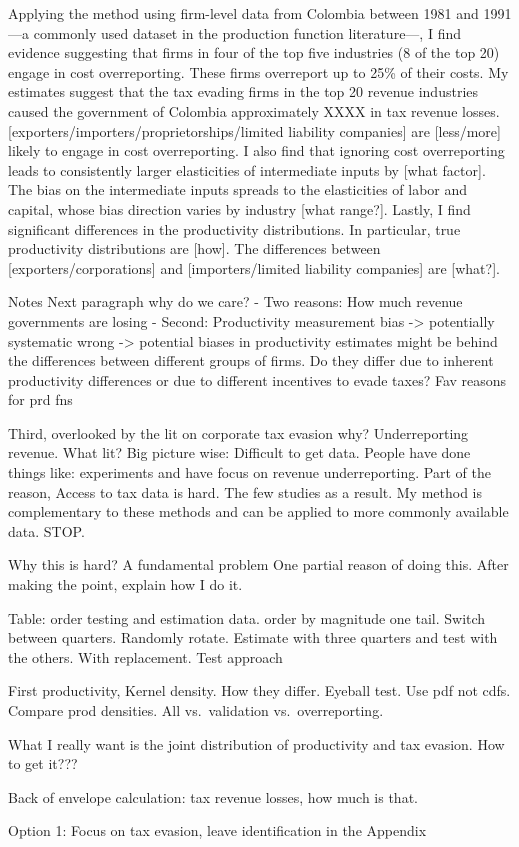 \documentclass[
  12pt]{article}
\theoremstyle{definition}
\theoremstyle{remark}
\begin{document}
 Applying the method using
firm-level data from Colombia between 1981 and 1991 ---a commonly used
dataset in the production function literature---, I find evidence
suggesting that firms in four of the top five industries (8 of the top
20) engage in cost overreporting. These firms overreport up to 25\% of
their costs. My estimates suggest that the tax evading firms in the top
20 revenue industries caused the government of Colombia approximately
XXXX in tax revenue losses.
{[}exporters/importers/proprietorships/limited liability companies{]}
are {[}less/more{]} likely to engage in cost overreporting. I also find
that ignoring cost overreporting leads to consistently larger
elasticities of intermediate inputs by {[}what factor{]}. The bias on
the intermediate inputs spreads to the elasticities of labor and
capital, whose bias direction varies by industry {[}what range?{]}.
Lastly, I find significant differences in the productivity
distributions. In particular, true productivity distributions are
{[}how{]}. The differences between {[}exporters/corporations{]} and
{[}importers/limited liability companies{]} are {[}what?{]}.

\begin{anfxnote}{Notes}
Next paragraph why do we care? - Two reasons: How much revenue
governments are losing - Second: Productivity measurement bias
-\textgreater{} potentially systematic wrong -\textgreater{} potential
biases in productivity estimates might be behind the differences between
different groups of firms. Do they differ due to inherent productivity
differences or due to different incentives to evade taxes? Fav reasons
for prd fns

Third, overlooked by the lit on corporate tax evasion why?
Underreporting revenue. What lit? Big picture wise: Difficult to get
data. People have done things like: experiments and have focus on
revenue underreporting. Part of the reason, Access to tax data is hard.
The few studies as a result. My method is complementary to these methods
and can be applied to more commonly available data. STOP.

Why this is hard? A fundamental problem One partial reason of doing
this. After making the point, explain how I do it.

Table: order testing and estimation data. order by magnitude one tail.
Switch between quarters. Randomly rotate. Estimate with three quarters
and test with the others. With replacement. Test approach

First productivity, Kernel density. How they differ. Eyeball test. Use
pdf not cdfs. Compare prod densities. All vs.~validation
vs.~overreporting.

What I really want is the joint distribution of productivity and tax
evasion. How to get it???

Back of envelope calculation: tax revenue losses, how much is that.

Option 1: Focus on tax evasion, leave identification in the Appendix

\end{anfxnote}
\end{document}

